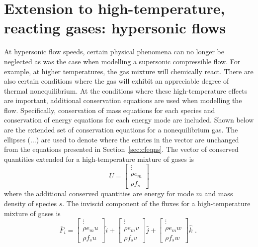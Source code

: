 \section{Extension to high-temperature, reacting gases: hypersonic flows}
At hypersonic flow speeds, certain physical phenomena can no longer
be neglected as was the case when modelling a supersonic compressible
flow.
For example, at higher temperatures, the gas mixture will chemically
react.
There are also certain conditions where the gas will exhibit an 
appreciable degree of thermal nonequilibrium.
At the conditions where these high-temperature effects are important, 
additional conservation equations are used when modelling the flow.
Specifically, conservation of mass equations for each species and conservation
of energy equations for each energy mode are included.
Shown below are the extended set of conservation equations
for a nonequilibrium gas.
The ellipses ($\dots$) are used to denote where the entries in the
vector are unchanged from the equations presented in Section~\ref{sec:cfeqns}.
The vector of conserved quantities extended for a high-temperature
mixture of gases is
\begin{equation}
 U = \left [ \begin{array}{c} 
                 \vdots \\
                 \rho e_{m} \\
                 \rho f_{s}
              \end{array} \right ]
 \label{eq:U_ht}
\end{equation}
where the additional conserved quantities are energy for mode $m$ and
mass density of species $s$.
The inviscid component of the fluxes for a high-temperature mixture
of gases is
\begin{equation}
 \overline{F}_{i} = \left [ \begin{array}{c}
                               \vdots \\
                               \rho e_{m} u \\
                               \rho f_{s} u
                            \end{array} \right ] \hat{i} 
                  + \left [ \begin{array}{c} 
                               \vdots \\
                               \rho e_{m} v \\
                               \rho f_{s} v
                            \end{array} \right ] \hat{j} 
                  + \left [ \begin{array}{c} 
                               \vdots \\
                               \rho e_{m} w \\
                               \rho f_{s} w 
                            \end{array} \right ] \hat{k} \text{ . }
\label{eq:F_i_ht}
\end{equation}
